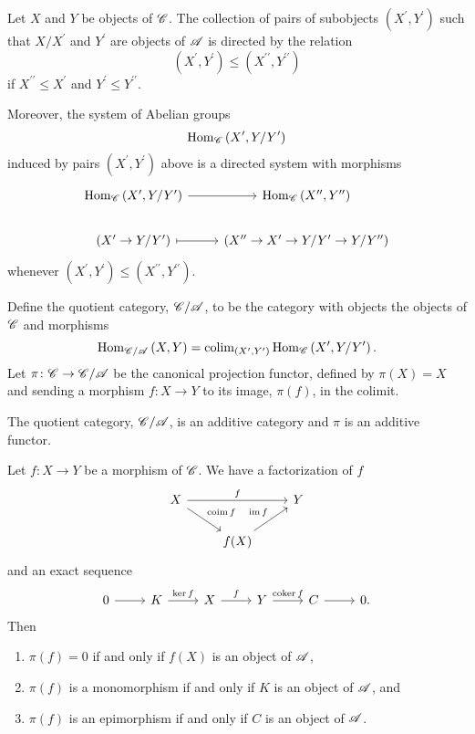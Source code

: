 \documentclass[dissertation.tex]{subfiles}
\begin{document}
\begin{prop}
  Let $X$ and $Y$ be objects of $\mathscr{C}$.
  The collection of pairs of subobjects $(X^\prime, Y^\prime)$ such that $X/X^\prime$ and $Y^\prime$ are objects of $\mathscr{A}$ is directed by the relation
  $$(X^\prime, Y^\prime) \leq (X^{\prime\prime}, Y^{\prime\prime})$$
  if $X^{\prime\prime} \leq X^\prime$ and $Y^\prime \leq Y^{\prime\prime}$.
  
  Moreover, the system of Abelian groups
  $$\operatorname{Hom}_{\mathscr{C}}\left(X^\prime, Y/Y^\prime\right)$$
  induced by pairs $(X^\prime, Y^\prime)$ above is a directed system with morphisms
  $$\begin{tikzcd}
    \Hom{\CC}{X^\prime, Y/Y^\prime} \arrow{r} &\Hom{\CC}{X^{\prime\prime}, Y^{\prime\prime}}\\
    (X^\prime \rightarrow Y/Y^\prime) \arrow[mapsto]{r} & (X^{\prime\prime} \rightarrow X^\prime \rightarrow Y/Y^\prime \rightarrow Y/Y^{\prime\prime})
  \end{tikzcd}$$
  whenever $(X^\prime, Y^\prime) \leq (X^{\prime\prime}, Y^{\prime\prime})$.
\end{prop}

\begin{defn}
  Define the quotient category, $\mathscr{C}/\mathscr{A}$, to be the category with objects the objects of $\mathscr{C}$ and morphisms
  $$\operatorname{Hom}_{\mathscr{C}/\mathscr{A}}\left(X, Y\right) = \operatorname{colim}_{(X^\prime, Y^\prime)} \operatorname{Hom}_{\mathscr{C}}\left(X^\prime, Y/Y^\prime\right).$$
  Let $\pi \colon \mathscr{C} \rightarrow \mathscr{C}/\mathscr{A}$ be the canonical projection functor, defined by $\pi(X) = X$ and sending a morphism $f \colon X \rightarrow Y$ to its image, $\pi(f)$, in the colimit.
\end{defn}

\begin{lem}
  The quotient category, $\mathscr{C}/\mathscr{A}$, is an additive category and $\pi$ is an additive functor.
\end{lem}

\begin{lem}
  Let $f \colon X \rightarrow Y$ be a morphism of $\mathscr{C}$.  
  We have a factorization of $f$
  $$\begin{tikzcd}
    X \arrow{rd}{\coim{f}}\arrow{rr}{f} & & Y\\
    & f(X)\arrow{ur}{\im{f}} & 
  \end{tikzcd}$$
  and an exact sequence 
  $$\begin{tikzcd}
    0 \arrow{r} & K \arrow{r}{\ker{f}} & X \arrow{r}{f} & Y \arrow{r}{\coker{f}} & C \arrow{r} & 0.
  \end{tikzcd}$$
  Then
  \begin{enumerate}
  \item
    $\pi(f) = 0$ if and only if $f(X)$ is an object of $\mathscr{A}$,
  \item
    $\pi(f)$ is a monomorphism if and only if $K$ is an object of $\mathscr{A}$, and
  \item
    $\pi(f)$ is an epimorphism if and only if $C$ is an object of $\mathscr{A}$.
  \end{enumerate}
\end{lem}
\end{document}
